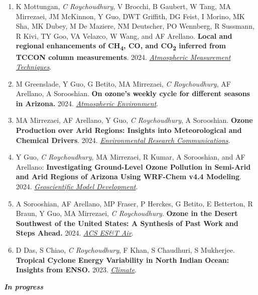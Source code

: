 \documentclass[margin,line]{resume}
\begin{document}
\begin{resume}
\begin{enumerate}[topsep=1pt, partopsep=1pt, itemsep=0.5pt, parsep=0.1pt, leftmargin=15pt,label=\arabic*.]
			\item K Mottungan, \textit{C Roychoudhury}, V Brocchi, B Gaubert, W Tang, MA Mirrezaei, JM McKinnon, Y Guo, DWT Griffith, DG Feist, I Morino, MK Sha, MK Dubey, M De Maziere, NM Deutscher, PO Wennberg, R Sussmann, R Kivi, TY Goo, VA Velazco, W Wang, and AF Arellano. \textbf{Local and regional enhancements of CH\textsubscript{4}, CO, and CO\textsubscript{2} inferred from TCCON column measurements}. 2024.  \href{https://doi.org/10.5194/amt-17-5861-2024}{\textit{Atmospheric Measurement Techniques}}.
			
			\item M Greenslade, Y Guo, G Betito, MA Mirrezaei, \textit{C Roychoudhury}, AF Arellano, A Sorooshian. \textbf{On ozone's weekly cycle for different seasons in Arizona.} 2024. \href{https://doi.org/10.1016/j.atmosenv.2024.120703}{\textit{Atmospheric Environment}}.
			
			\item MA Mirrezaei, AF Arellano, Y Guo, \textit{C Roychoudhury}, A Sorooshian. \textbf{Ozone Production over Arid Regions: Insights into Meteorological and Chemical Drivers}. 2024. \href{https://iopscience.iop.org/article/10.1088/2515-7620/ad484c}{\textit{Environmental Research Communications}}.
			
			\item Y Guo, \textit{C Roychoudhury}, MA Mirrezaei, R Kumar, A Sorooshian, and AF Arellano: \textbf{Investigating Ground-Level Ozone Pollution in Semi-Arid and Arid Regions of Arizona Using WRF-Chem v4.4 Modeling}. 2024.
			\href{https://doi.org/10.5194/gmd-17-4331-2024}{\textit{Geoscientific Model Development}}.
			
			\item A Sorooshian, AF Arellano, MP Fraser, P Herckes, G Betito, E Betterton, R Braun, Y Guo, MA Mirrezaei, \textit{C Roychoudhury}. \textbf{Ozone in the Desert Southwest of the United States: A Synthesis of Past Work and Steps Ahead.} 2024.  \href{https://doi.org/10.1021/acsestair.3c00033}{\textit{ACS ES\&T Air}}.
			
			\item D Das, S Chiao, \textit{C Roychoudhury}, F Khan, S Chaudhuri, S Mukherjee. \textbf{Tropical Cyclone Energy Variability in North Indian Ocean: Insights from ENSO.} 2023.
			\href{https://www.mdpi.com/2225-1154/11/12/232}{\textit{Climate}}.
			
		\end{enumerate}
	
	
		\textbf{\emph{\textcolor{sep}{{In progress}}}}
			\begin{enumerate}[topsep=1pt, partopsep=1pt, itemsep=0.5pt, parsep=0.1pt, leftmargin=15pt,label=\arabic*.]
				

\end{enumerate}
\end{resume}
\end{document}
